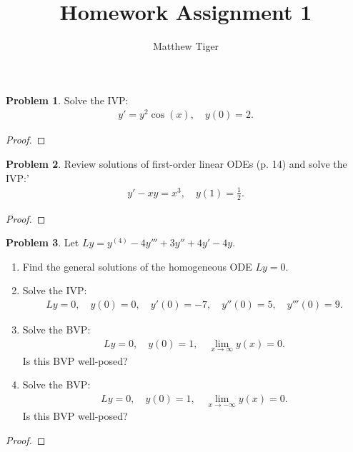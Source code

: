 \documentclass[12pt]{article}
\title{Homework Assignment 1}
\author{Matthew Tiger}
\theoremstyle{definition}
\newtheorem{problem}{Problem}
\begin{document}
\maketitle


\begin{problem}
  Solve the IVP:
  \begin{align*}
    y' = y^2\cos(x),\quad y(0)=2.
  \end{align*}
\end{problem}

\begin{proof}
\end{proof}
\newpage


\begin{problem}
  Review solutions of first-order linear ODEs (p. 14) and solve the IVP:'
  \begin{align*}
    y' - xy = x^3,\quad y(1) = \frac{1}{2}.
  \end{align*}
\end{problem}

\begin{proof}
\end{proof}
\newpage


\begin{problem}
  Let $Ly = y^{(4)} - 4 y''' + 3y'' +4y' -4y$.
  \begin{enumerate}
    \item Find the general solutions of the homogeneous ODE $Ly = 0$.
    \item Solve the IVP:
      \begin{align*}
        Ly = 0,\quad y(0) = 0, \quad y'(0)= -7, \quad y''(0) = 5, \quad y'''(0) = 9.
      \end{align*}
    \item Solve the BVP:
      \begin{align*}
        Ly = 0,\quad y(0) = 1, \quad \lim_{x\to\infty}y(x) = 0.
      \end{align*}
      Is this BVP well-posed?
    \item Solve the BVP:
      \begin{align*}
        Ly = 0,\quad y(0) = 1, \quad \lim_{x\to-\infty}y(x) = 0.
      \end{align*}
      Is this BVP well-posed?
  \end{enumerate}
\end{problem}

\begin{proof}
\end{proof}
\newpage
\end{document}
